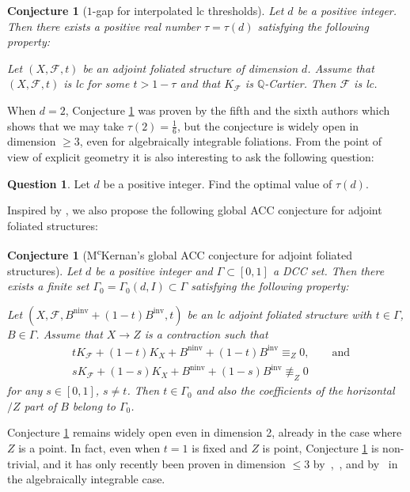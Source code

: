 \documentclass[12pt]{amsart}
\numberwithin{equation}{section}
\newcommand{\Qq}{\mathbb{Q}}
\newcommand{\ninv}{\operatorname{ninv}}
\newcommand{\inv}{\operatorname{inv}}
\newcommand{\Ff}{\mathcal{F}}
\newcommand{\Ii}{\Gamma}
\newtheorem{conj}[thm]{Conjecture}
\theoremstyle{definition}
\newtheorem{ques}[thm]{Question}
\theoremstyle{definition}
\theoremstyle{definition}
\begin{document}
\begin{conj}[$1$-gap for interpolated lc thresholds]\label{conj: 1-gap lct}
Let $d$ be a positive integer. Then there exists a positive real number $\tau=\tau(d)$ satisfying the following property:

Let $(X,\Ff,t)$ be an adjoint foliated structure of dimension $d$.
Assume that $(X,\Ff,t)$ is lc for some $t>1-\tau$ and that $K_{\Ff}$ is $\Qq$-Cartier. 
Then $\Ff$ is lc.
\end{conj}

When $d=2$, Conjecture \ref{conj: 1-gap lct} was proven by the fifth and the sixth authors \cite[Lemma 2.19]{SS23} which shows that we may take $\tau(2)=\frac{1}{6}$, but the conjecture is widely open in dimension $\geq 3$, even for algebraically integrable foliations. From the point of view of explicit geometry it is also interesting to ask the following question:

\begin{ques}
Let $d$ be a positive integer. Find the optimal value of $\tau(d)$.
\end{ques}


Inspired by \cite{HMX14}, we also propose the following global ACC conjecture for adjoint foliated structures:

\begin{conj}[M\textsuperscript{c}Kernan's global ACC conjecture for adjoint foliated structures]\label{conj: interpolated global acc}
Let $d$ be a positive integer and $\Ii\subset [0,1]$ a DCC set. Then there exists a finite set $\Ii_0 = \Ii_0(d, I) \subset \Ii$ satisfying the following property:

Let $(X,\Ff,B^{\ninv}+(1-t)B^{\inv},t)$ be an lc adjoint foliated structure with $t\in\Ii$, $B\in\Ii$.
Assume that $X\rightarrow Z$ is a contraction such that 
\begin{align*}
& tK_{\Ff}+(1-t)K_X+B^{\ninv}+(1-t)B^{\inv}\equiv_Z 0,
\qquad
\text{and}
\\
& sK_{\Ff}+(1-s)K_X+B^{\ninv}+(1-s)B^{\inv}\not\equiv_Z 0
\end{align*}
for any $s \in [0, 1]$, $s \neq t$.
Then $t\in\Ii_0$ and also the coefficients of the horizontal$/Z$ part of $B$ belong to $\Ii_0$.
\end{conj}


Conjecture \ref{conj: interpolated global acc} remains widely open even in dimension 2, already in the case where $Z$ is a point. 
In fact, even when $t=1$ is fixed and $Z$ is point, 
Conjecture \ref{conj: interpolated global acc} is non-trivial, and it has only recently been proven in dimension $\leq 3$ by~\cite[Theorem 2.5]{Che22},~\cite[Theorem 1.1]{LMX24a}, and by~\cite[Theorem 1.2]{DLM23} in the algebraically integrable case.
\end{document}
